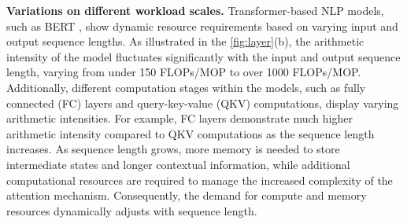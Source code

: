 \noindent
\textbf{Variations on different workload scales.}
Transformer-based \cite{vaswani2017attention} NLP models, such as BERT \cite{devlin2018bert}, show dynamic resource requirements based on varying input and output sequence lengths.
As illustrated in the \fig \ref{fig:layer}(b), the arithmetic intensity of the model fluctuates significantly with the input and output sequence length, varying from under 150 FLOPs/MOP to over 1000 FLOPs/MOP.
Additionally, different computation stages within the models, such as fully connected (FC) layers and query-key-value (QKV) computations, display varying arithmetic intensities. For example, FC layers demonstrate much higher arithmetic intensity compared to QKV computations as the sequence length increases.
As sequence length grows, more memory is needed to store intermediate states and longer contextual information, while additional computational resources are required to manage the increased complexity of the attention mechanism. Consequently, the demand for compute and memory resources dynamically adjusts with sequence length.
\begin{comment}

Meanwhile, the different computation stages also have various arithmetic intensities, e.g. the arithmetic intensities of FCs are much higher than the QKV when the sequence length increases.
As the sequence length increases, the model requires more memory to store intermediate states and longer contextual information. Additionally, longer sequences necessitate more computational resources to handle the increased complexity of the attention mechanism. Consequently, the compute and memory resources requirement changes dynamically with sequence length. 
    
\end{comment}


